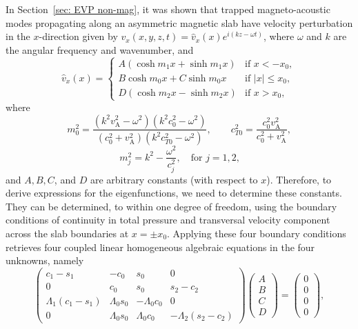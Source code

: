 \documentclass[12pt]{../style-files/ociamthesis}
\begin{document}
In Section~\ref{sec: EVP non-mag}, it was shown that trapped magneto-acoustic modes propagating along an asymmetric magnetic slab have velocity perturbation in the $x$-direction given by $v_x(x,y,z,t) = \widehat{v}_x(x)e^{i(kz-\omega t)}$, where $\omega$ and $k$ are the angular frequency and wavenumber, and
\begin{equation}
\hat{v}_x(x)=
\begin{cases}
A(\cosh{m_1x} + \sinh{m_1x}) & \text{if } x < -x_0, \\
B\cosh{m_0x} + C\sinh{m_0x} & \text{if } |x| \leq x_0, \\
D(\cosh{m_2x} - \sinh{m_2x}) & \text{if } x > x_0, \label{vsoln}
\end{cases}
\end{equation}
where
\begin{equation}
m_0^2 = \frac{(k^2v_\textrm{A}^2 - \omega^2)(k^2c_0^2 - \omega^2)}{(c_0^2 + v_\textrm{A}^2)(k^2c_{T0}^2-\omega^2)}, \qquad c_{T0}^2 = \frac{c_0^2v_\textrm{A}^2}{c_0^2 + v_\textrm{A}^2}, \label{m0}
\end{equation}
\begin{equation}
m_j^2 = k^2 - \frac{\omega^2}{c_j^2}, \quad \text{for $j = 1, 2$,} \label{m1,2}
\end{equation}
and $A, B, C$, and $D$ are arbitrary constants (with respect to $x$). Therefore, to derive expressions for the eigenfunctions, we need to determine these constants. They can be determined, to within one degree of freedom, using the boundary conditions of continuity in total pressure and transversal velocity component across the slab boundaries at $x = \pm x_0$. Applying these four boundary conditions retrieves four coupled linear homogeneous algebraic equations in the four unknowns, namely
\begin{equation}
\left(
\begin{matrix}
c_1 - s_1 &-c_0                       &s_0                        &0 \\
0       &c_0                        &s_0                        &s_2 - c_2 \\
\Lambda_1(c_1 - s_1)       &\Lambda_0s_0 &-\Lambda_0c_0  &0 \\
0       &\Lambda_0s_0                          &\Lambda                   _0c_0 &-\Lambda_2(s_2 - c_2)
\end{matrix}
\right)
\left(
\begin{matrix}
A \\
B \\
C \\
D
\end{matrix}
\right)
=
\left(
\begin{matrix}
0 \\
0 \\
0 \\
0
\end{matrix}
\right),
\label{coefmatrix}
\end{equation}
\end{document}
